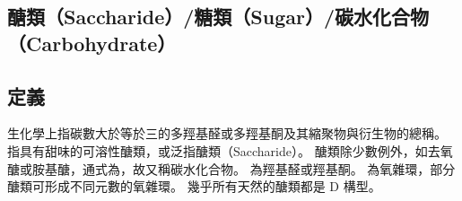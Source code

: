 \documentclass[a4paper,12pt]{report}
\begin{document}
\begin{itemize}
\section{醣類（Saccharide）/糖類（Sugar）/碳水化合物（Carbohydrate）}
\subsection{定義}
生化學上指碳數大於等於三的多羥基醛或多羥基酮及其縮聚物與衍生物的總稱。
指具有甜味的可溶性醣類，或泛指醣類（Saccharide）。
醣類除少數例外，如去氧醣或胺基醣，通式為，故又稱碳水化合物。
為羥基醛或羥基酮。
為氧雜環，部分醣類可形成不同元數的氧雜環。
幾乎所有天然的醣類都是 D 構型。

\end{itemize}
\end{document}
